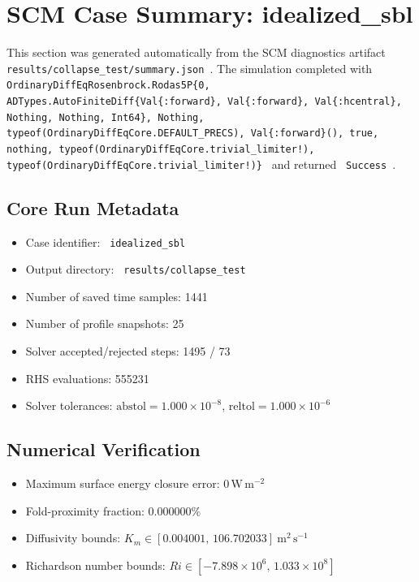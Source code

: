 \section{SCM Case Summary: idealized\_sbl}
\label{sec:scm_case_idealized_sbl}

This section was generated automatically from the SCM diagnostics artifact
\texttt{ results/collapse\_test/summary.json }. The simulation completed with \texttt{ OrdinaryDiffEqRosenbrock.Rodas5P\{0, ADTypes.AutoFiniteDiff\{Val\{:forward\}, Val\{:forward\}, Val\{:hcentral\}, Nothing, Nothing, Int64\}, Nothing, typeof(OrdinaryDiffEqCore.DEFAULT\_PRECS), Val\{:forward\}(), true, nothing, typeof(OrdinaryDiffEqCore.trivial\_limiter!), typeof(OrdinaryDiffEqCore.trivial\_limiter!)\} }
and returned \texttt{ Success }.

\subsection{Core Run Metadata}
\begin{itemize}
  \item Case identifier: \texttt{ idealized\_sbl }
  \item Output directory: \texttt{ results/collapse\_test }
  \item Number of saved time samples: 1441
  \item Number of profile snapshots: 25
  \item Solver accepted/rejected steps: 1495 / 73
  \item RHS evaluations: 555231
  \item Solver tolerances: $\mathrm{abstol}=1.000 \times 10^{-8}$, $\mathrm{reltol}=1.000 \times 10^{-6}$
\end{itemize}

\subsection{Numerical Verification}
\begin{itemize}
  \item Maximum surface energy closure error:
  $0\,\mathrm{W\,m^{-2}}$
  \item Fold-proximity fraction:
  $0.000000\%$
  \item Diffusivity bounds:
  $K_m \in [0.004001,\,106.702033]~\mathrm{m^2\,s^{-1}}$
  \item Richardson number bounds:
  $Ri \in [-7.898 \times 10^{6},\,1.033 \times 10^{8}]$
\end{itemize}

